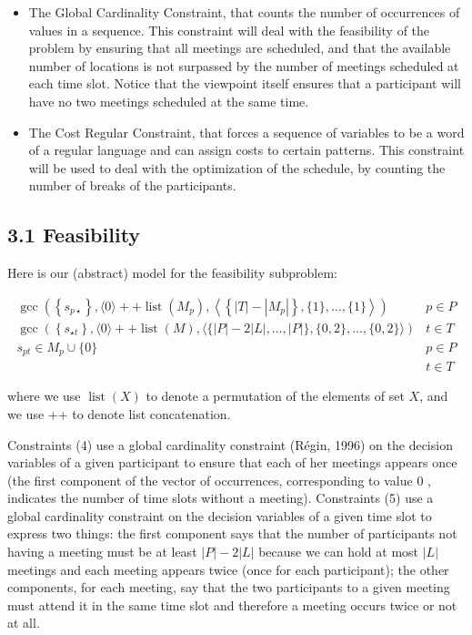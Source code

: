 \documentclass[10pt]{article}
\begin{document}
\begin{itemize}
  \item The Global Cardinality Constraint, that counts the number of occurrences of values in a sequence. This constraint will deal with the feasibility of the problem by ensuring that all meetings are scheduled, and that the available number of locations is not surpassed by the number of meetings scheduled at each time slot. Notice that the viewpoint itself ensures that a participant will have no two meetings scheduled at the same time.
  \item The Cost Regular Constraint, that forces a sequence of variables to be a word of a regular language and can assign costs to certain patterns. This constraint will be used to deal with the optimization of the schedule, by counting the number of breaks of the participants.
\end{itemize}

\subsection*{3.1 Feasibility}
Here is our (abstract) model for the feasibility subproblem:

\[
\begin{array}{rr}
\operatorname{gcc}\left(\left\{s_{p \star}\right\},\langle 0\rangle++\operatorname{list}\left(M_{p}\right),\left\langle\left\{|T|-\left|M_{p}\right|\right\},\{1\}, \ldots,\{1\}\right\rangle\right) & p \in P \\
\operatorname{gcc}\left(\left\{s_{\star t}\right\},\langle 0\rangle++\operatorname{list}(M),\langle\{|P|-2|L|, \ldots,|P|\},\{0,2\}, \ldots,\{0,2\}\rangle\right) & t \in T \\
s_{p t} \in M_{p} \cup\{0\} & p \in P \\
& t \in T \tag{6}
\end{array}
\]

where we use $\operatorname{list}(X)$ to denote a permutation of the elements of set $X$, and we use ++ to denote list concatenation.

Constraints (4) use a global cardinality constraint (Régin, 1996) on the decision variables of a given participant to ensure that each of her meetings appears once (the first component of the vector of occurrences, corresponding to value 0 , indicates the number of time slots without a meeting). Constraints (5) use a global cardinality constraint on the decision variables of a given time slot to express two things: the first component says that the number of participants not having a meeting must be at least $|P|-2|L|$ because we can hold at most $|L|$ meetings and each meeting appears twice (once for each participant); the other components, for each meeting, say that the two participants to a given meeting must attend it in the same time slot and therefore a meeting occurs twice or not at all.
\end{document}

